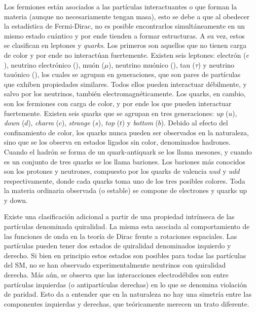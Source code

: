 Los fermiones están asociados a las partículas interactuantes o que forman la materia (aunque no necesariamente tengan masa), esto se debe a que al obedecer la estadística de Fermi-Dirac, no es posible encontrarlos simultáneamente en un mismo estado cuántico y por ende tienden a formar estructuras. A su vez, estos se clasifican en leptones y \textit{quarks}. Los primeros son aquellos que no tienen carga de color y por ende no interactúan fuertemente. Existen seis leptones: electrón ($e$), neutrino electrónico (\nue), muón ($\mu$), neutrino muónico (\numu), tau ($\tau$) y neutrino tauónico (\nutau), los cuales se agrupan en generaciones, que son pares de partículas que exhiben propiedades similares. Todos ellos pueden interactuar débilmente, y salvo por los neutrinos, también electromagnéticamente. Los quarks, en cambio, son los fermiones con carga de color, y por ende los que pueden interactuar fuertemente. Existen seis quarks que se agrupan en tres generaciones: \textit{up} ($u$), \textit{down} ($d$), \textit{charm} ($c$), \textit{strange} ($s$), \textit{top} ($t$) y \textit{bottom} ($b$). Debido al efecto del confinamiento de color, los quarks nunca pueden ser observados en la naturaleza, sino que se los observa en estados ligados sin color, denominados hadrones. Cuando el hadrón se forma de un quark-antiquark se los llama mesones, y cuando es un conjunto de tres quarks se los llama bariones. Los bariones más conocidos son los protones y neutrones, compuesto por los quarks de valencia $uud$ y $udd$ respectivamente, donde cada quarks toma uno de los tres posibles colores. Toda la materia ordinaria observada (o estable) se compone de electrones y quarks up y down. 

Existe una clasificación adicional a partir de una propiedad intrínseca de las partículas denominada quiralidad. La misma esta asociada al comportamiento de las funciones de onda en la teoría de Dirac frente a rotaciones espaciales. Las partículas pueden tener dos estados de quiralidad denominados izquierdo y derecho. Si bien en principio estos estados son posibles para todas las partículas del SM, no se han observado experimentalmente neutrinos con quiralidad derecha. Más aún, se observa que las interacciones electrodébiles son entre partículas izquierdas (o antipartículas derechas) en lo que se denomina violación de paridad. Esto da a entender que en la naturaleza no hay una simetría entre las componentes izquierdas y derechas, que teóricamente merecen un trato diferente.

